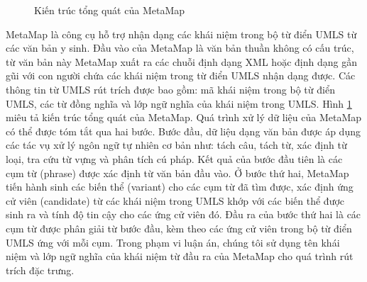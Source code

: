 \begin{figure}[h]
\centering
{}
\caption{Kiến trúc tổng quát của MetaMap\label{metamapstructure}}
\end{figure}

MetaMap là công cụ hỗ trợ nhận dạng các khái niệm trong bộ từ điển UMLS từ các văn bản y sinh. Đầu vào của MetaMap là văn bản thuần không có cấu trúc, từ văn bản này MetaMap xuất ra các chuỗi định dạng XML hoặc định dạng gần gũi với con người chứa các khái niệm trong từ điển UMLS nhận dạng được. Các thông tin từ UMLS rút trích được bao gồm: mã khái niệm trong bộ từ điển UMLS, các từ đồng nghĩa và lớp ngữ nghĩa của khái niệm trong UMLS. Hình \ref{metamapstructure} miêu tả kiến trúc tổng quát của MetaMap. Quá trình xử lý dữ liệu của MetaMap có thể được tóm tắt qua hai bước. Bước đầu, dữ liệu dạng văn bản được áp dụng các tác vụ xử lý ngôn ngữ tự nhiên cơ bản như: tách câu, tách từ, xác định từ loại, tra cứu từ vựng và phân tích cú pháp. Kết quả của bước đầu tiên là các cụm từ (phrase) được xác định từ văn bản đầu vào. Ở bước thứ hai, MetaMap tiến hành sinh các biến thể (variant) cho các cụm từ đã tìm được, xác định ứng cử viên (candidate) từ các khái niệm trong UMLS khớp với các biến thể được sinh ra và tính độ tin cậy cho các ứng cử viên đó. Đầu ra của bước thứ hai là các cụm từ được phân giải từ bước đầu, kèm theo các ứng cử viên trong bộ từ điển UMLS ứng với mỗi cụm. Trong phạm vi luận án, chúng tôi sử dụng tên khái niệm và lớp ngữ nghĩa của khái niệm từ đầu ra của MetaMap cho quá trình rút trích đặc trưng.

